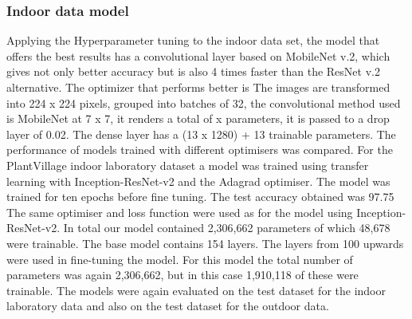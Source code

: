 \documentclass[conference]{IEEEtran}
\begin{document}
\subsubsection{Indoor data model}
Applying the Hyperparameter tuning to the indoor data set, the model that offers the best results has a convolutional layer based on MobileNet v.2, which gives not only better accuracy but is also 4 times faster than the ResNet v.2 alternative. The optimizer that performs better is  
The images are transformed into 224 x 224 pixels, grouped into batches of 32, the convolutional method used is MobileNet at 7 x 7, it renders a total of x parameters, it is passed to a drop layer of 0.02. The dense layer has a  (13 x 1280) + 13 trainable parameters. 
The performance of models trained with different optimisers was compared. For the PlantVillage indoor laboratory dataset a model was trained using transfer learning with Inception-ResNet-v2 and the Adagrad optimiser. The model was trained for ten epochs before fine tuning. The test accuracy obtained was 97.75%
The same optimiser and loss function were used as for the model using Inception-ResNet-v2. In total our model contained 2,306,662 parameters of which 48,678 were trainable. The base model contains 154 layers. The layers from 100 upwards were used in fine-tuning the model. For this model the total number of parameters was again 2,306,662, but in this case 1,910,118 of these were trainable. The models were again evaluated on the test dataset for the indoor laboratory data and also on the test dataset for the outdoor data. 
\end{document}
